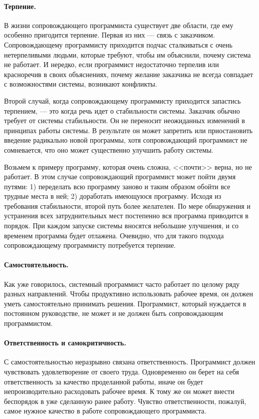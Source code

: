 \documentclass{../../text-style}
\begin{document}
\paragraph{Терпение.} В жизни сопровождающего программиста существует две области, где ему особенно пригодится терпение. Первая из них --- связь с заказчиком. Сопровождающему программисту приходится подчас сталкиваться с очень нетерпеливыми людьми, которые требуют, чтобы им объяснили, почему система не работает. И нередко, если программист недостаточно терпелив или красноречив в своих объяснениях, почему желание заказчика не всегда совпадает с возможностями системы, возникают конфликты.

Второй случай, когда сопровождающему программисту приходится запастись терпением, --- это когда речь идет о стабильности системы. Заказчик обычно требует от системы стабильности. Он не переносит неожиданных изменений в принципах работы системы. В результате он может запретить или приостановить введение радикально новой программы, хотя сопровождающий программист не сомневается, что оно может существенно улучшить работу системы. 

Возьмем к примеру программу, которая очень сложна, <<почти>> верна, но не работает. В этом случае сопровождающий программист может пойти двумя путями: 1) переделать всю программу заново и таким образом обойти все трудные места в ней; 2) доработать имеющуюся программу. Исходя из требования стабильности, второй путь более желателен. По мере обнаружения и устранения всех затруднительных мест постепенно вся программа приводится в порядок. При каждом запуске системы вносятся небольшие улучшения, и со временем программа будет отлажена. Очевидно, что для такого подхода сопровождающему программисту потребуется терпение.

\paragraph{Самостоятельность.} Как уже говорилось, системный программист часто работает по целому ряду разных направлений. Чтобы продуктивно использовать рабочее время, он должен уметь самостоятельно принимать решения. Программист, который нуждается в постоянном руководстве, не может и не должен быть сопровождающим программистом.

\paragraph{Ответственность и самокритичность.} С самостоятельностью неразрывно связана ответственность. Программист должен чувствовать удовлетворение от своего труда. Одновременно он берет на себя ответственность за качество проделанной работы, иначе он будет непроизводительно расходовать рабочее время. К тому же он может внести беспорядок в уже сделанную ранее работу. Чувство ответственности, пожалуй, самое нужное качество в работе сопровождающего программиста.
\end{document}
